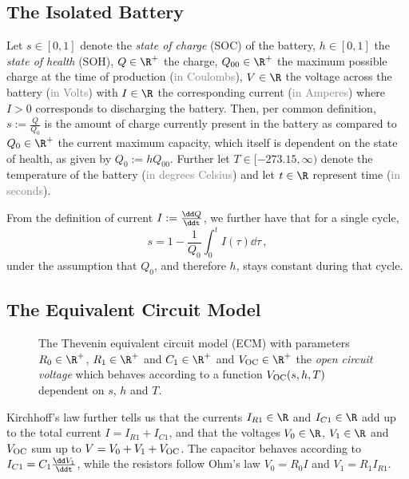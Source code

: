 \documentclass[12pt, a4paper]{article}
\begin{document}
  \subsection{The Isolated Battery}
  Let
  $s \in [0, 1]$ denote the \textit{state of charge} (SOC) of the battery,
  $h \in [0, 1]$ the \textit{state of health} (SOH),
  $Q \in \R^+$ the charge,
  $Q_{00} \in \R^+$ the maximum possible charge at the time of production (\textcolor{gray}{in Coulombs}),
  $V \in \R$ the voltage across the battery (\textcolor{gray}{in Volts}) with
  $I \in \R$ the corresponding current (\textcolor{gray}{in Amperes}) where $I > 0$ corresponds to discharging the battery.
  Then, per common definition, $s := \frac{Q}{Q_0}$ is the amount of charge currently present in the battery as compared to $Q_0 \in \R^+$ the current maximum capacity, which itself is dependent on the state of health, as given by $Q_0 := h Q_{00}$.
  Further let
  $T \in [-273.15, \infty)$ denote the temperature of the battery (\textcolor{gray}{in degrees Celsius}) and
  let $t \in \R$ represent time (\textcolor{gray}{in seconds}).

  From the definition of current $I := \frac{\dd Q}{\ddt}$, we further have that for a single cycle,
  $$s = 1 - \frac{1}{Q_0} \int_0^t I(\tau) \dd\tau \,,$$
  under the assumption that $Q_0$, and therefore $h$, stays constant during that cycle.

  \subsection{The Equivalent Circuit Model}
  \begin{figure}[H]
    \centering
    \caption{
      The Thevenin equivalent circuit model (ECM) with parameters $R_0 \in \R^+$, $R_1 \in \R^+$ and $C_1 \in \R^+$ and $V_{\rm OC} \in \R^+$ the \textit{open circuit voltage} which behaves according to a function $V_{\rm OC}(s, h, T)$ dependent on $s$, $h$ and $T$.
    }
  \end{figure}

  Kirchhoff's law further tells us that the currents $I_{R1} \in \R$ and $I_{C1} \in \R$ add up to the total current $I = I_{R1} + I_{C1}$, and that the voltages $V_0 \in \R$, $V_1 \in \R$ and $V_{\rm OC}$ sum up to $V = V_0 + V_1 + V_{\rm OC}$.
  The capacitor behaves according to $I_{C1} = C_1 \frac{\dd V_1}{\ddt}$, while the resistors follow Ohm's law $V_0 = R_0 I$ and $V_1 = R_1 I_{R1}$.
\end{document}
